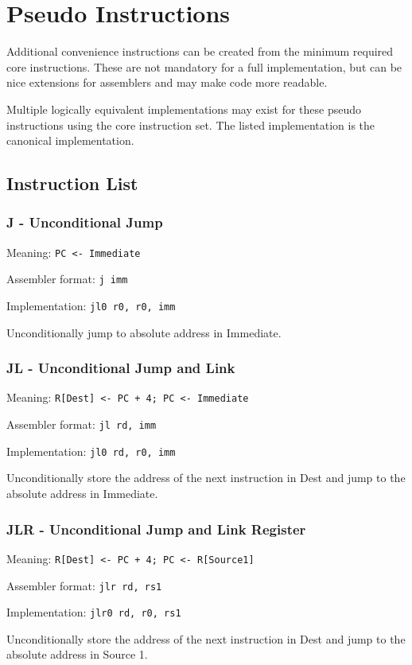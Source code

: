 \documentclass{article}
\begin{document}
\section{Pseudo Instructions}
Additional convenience instructions can be created from the minimum required core instructions.
These are not mandatory for a full implementation, but can be nice extensions for assemblers and
may make code more readable.

Multiple logically equivalent implementations may exist for these pseudo instructions using the
core instruction set. The listed implementation is the canonical implementation.

\subsection{Instruction List}

\subsubsection{J - Unconditional Jump}
Meaning: \verb|PC <- Immediate|

Assembler format: \verb|j imm|

Implementation: \verb|jl0 r0, r0, imm|

Unconditionally jump to absolute address in Immediate.

\subsubsection{JL - Unconditional Jump and Link}
Meaning: \verb|R[Dest] <- PC + 4; PC <- Immediate|

Assembler format: \verb|jl rd, imm|

Implementation: \verb|jl0 rd, r0, imm|

Unconditionally store the address of the next instruction in Dest and jump to the absolute
address in Immediate.

\subsubsection{JLR - Unconditional Jump and Link Register}
Meaning: \verb|R[Dest] <- PC + 4; PC <- R[Source1]|

Assembler format: \verb|jlr rd, rs1|

Implementation: \verb|jlr0 rd, r0, rs1|

Unconditionally store the address of the next instruction in Dest and jump to the absolute
address in Source 1.
\end{document}
